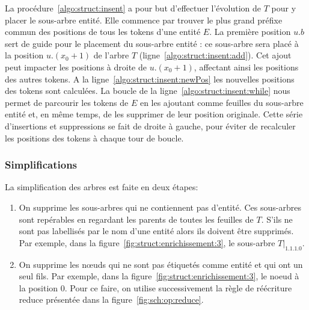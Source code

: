 La procédure~\ref{algo:struct:insent} a pour but d'effectuer l'évolution de $T$ pour y placer le sous-arbre entité.
Elle commence par trouver le plus grand préfixe commun des positions de tous les tokens d'une entité $E$.
La première position $u.b$ sert de guide pour le placement du sous-arbre entité : ce sous-arbre sera placé à la position $u.(x_0+1)$ de l'arbre $T$ (ligne~\ref{algo:struct:insent:add}).
Cet ajout peut impacter les positions à droite de $u.(x_0+1)$, affectant ainsi les positions des autres tokens.
A la ligne~\ref{algo:struct:insent:newPos} les nouvelles positions des tokens sont calculées.
La boucle de la ligne~\ref{algo:struct:insent:while} nous permet de parcourir les tokens de $E$ en les ajoutant comme feuilles du sous-arbre entité et, en même temps, de les supprimer de leur position originale.
Cette série d'insertions et suppressions se fait de droite à gauche, pour éviter de recalculer les positions des tokens à chaque tour de boucle.

\subsubsection{Simplifications}
\label{sec:struct:simplify}

La simplification des arbres est faite en deux étapes:
\begin{enumerate}
    \item On supprime les sous-arbres qui ne contiennent pas d'entité.
          Ces sous-arbres sont repérables en regardant les parents de toutes les feuilles de $T$.
          S'ils ne sont pas labellisés par le nom d'une entité alors ils doivent être supprimés.
          Par exemple, dans la figure~\ref{fig:struct:enrichissement:3}, le sous-arbre $T|_{1.1.1.0}$.

    \item On supprime les nœuds qui ne sont pas étiquetés comme entité et qui ont un seul fils.
          Par exemple, dans la figure~\ref{fig:struct:enrichissement:3}, le noeud à la position $0$.
          Pour ce faire, on utilise successivement la règle de réécriture \textsf{reduce} présentée dans la figure~\ref{fig:sch:op:reduce}.
\end{enumerate}

